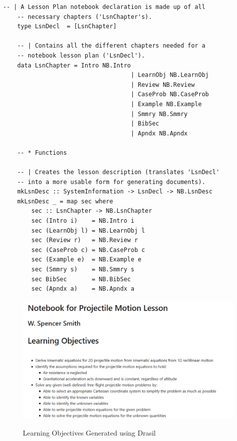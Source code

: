 \newpage

\begin{lstlisting}[language=haskell1, 
	basicstyle=\linespread{1.1}\small\ttfamily]	
	-- | A Lesson Plan notebook declaration is made up of all 
	-- necessary chapters ('LsnChapter's).
	type LsnDecl  = [LsnChapter]
	
	-- | Contains all the different chapters needed for a 
	-- notebook lesson plan ('LsnDecl').
	data LsnChapter = Intro NB.Intro
									| LearnObj NB.LearnObj
									| Review NB.Review
									| CaseProb NB.CaseProb
									| Example NB.Example
									| Smmry NB.Smmry
									| BibSec
									| Apndx NB.Apndx
	
	-- * Functions
	
	-- | Creates the lesson description (translates 'LsnDecl' 
	-- into a more usable form for generating documents).
	mkLsnDesc :: SystemInformation -> LsnDecl -> NB.LsnDesc
	mkLsnDesc _ = map sec where
		sec :: LsnChapter -> NB.LsnChapter
		sec (Intro i)    = NB.Intro i
		sec (LearnObj l) = NB.LearnObj l
		sec (Review r)   = NB.Review r  
		sec (CaseProb c) = NB.CaseProb c
		sec (Example e)  = NB.Example e  
		sec (Smmry s)    = NB.Smmry s
		sec BibSec       = NB.BibSec
		sec (Apndx a)    = NB.Apndx a
\end{lstlisting}

\begin{figure}
	\caption{Learning Objectives Generated using Drasil}
	\includegraphics[width=1\textwidth]{figures/learnObj.png}
	\label{fig:learnObj}
\end{figure}

